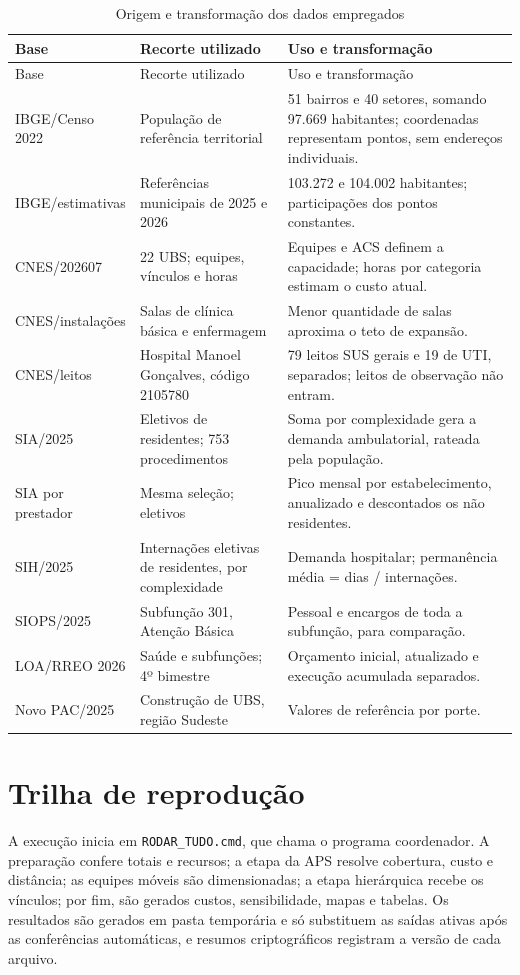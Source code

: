 \begin{longtable}{p{.20\linewidth}p{.30\linewidth}p{.39\linewidth}}
\caption{Origem e transformação dos dados empregados}\label{tab:rastreabilidade}\\
\toprule Base & Recorte utilizado & Uso e transformação\\\midrule\endfirsthead
\toprule Base & Recorte utilizado & Uso e transformação\\\midrule\endhead
IBGE/Censo 2022 & População de referência territorial & 51 bairros e 40 setores, somando 97.669 habitantes; coordenadas representam pontos, sem endereços individuais.\\
IBGE/estimativas & Referências municipais de 2025 e 2026 & 103.272 e 104.002 habitantes; participações dos pontos constantes.\\
CNES/202607 & 22 UBS; equipes, vínculos e horas & Equipes e ACS definem a capacidade; horas por categoria estimam o custo atual.\\
CNES/instalações & Salas de clínica básica e enfermagem & Menor quantidade de salas aproxima o teto de expansão.\\
CNES/leitos & Hospital Manoel Gonçalves, código 2105780 & 79 leitos SUS gerais e 19 de UTI, separados; leitos de observação não entram.\\
SIA/2025 & Eletivos de residentes; 753 procedimentos & Soma por complexidade gera a demanda ambulatorial, rateada pela população.\\
SIA por prestador & Mesma seleção; eletivos & Pico mensal por estabelecimento, anualizado e descontados os não residentes.\\
SIH/2025 & Internações eletivas de residentes, por complexidade & Demanda hospitalar; permanência média = dias / internações.\\
SIOPS/2025 & Subfunção 301, Atenção Básica & Pessoal e encargos de toda a subfunção, para comparação.\\
LOA/RREO 2026 & Saúde e subfunções; 4º bimestre & Orçamento inicial, atualizado e execução acumulada separados.\\
Novo PAC/2025 & Construção de UBS, região Sudeste & Valores de referência por porte.\\
\bottomrule
\end{longtable}

\section{Trilha de reprodução}
A execução inicia em \texttt{RODAR\_TUDO.cmd}, que chama o programa coordenador. A preparação confere
totais e recursos; a etapa da APS resolve cobertura, custo e distância; as equipes móveis são
dimensionadas; a etapa hierárquica recebe os vínculos; por fim, são gerados custos, sensibilidade, mapas
e tabelas. Os resultados são gerados em pasta temporária e só substituem as saídas ativas após as
conferências automáticas, e resumos criptográficos registram a versão de cada arquivo.

